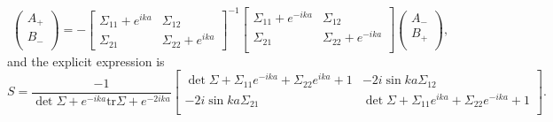 \begin{widetext}
\begin{equation}
\label{eq:discrete_S}
\begin{pmatrix}
A_{+} \\
B_{-}\\
\end{pmatrix}
=-
\begin{bmatrix}
\Sigma_{11} +e^{ika} & \Sigma_{12}\\
\Sigma_{21} & \Sigma_{22} + e^{ika}
\end{bmatrix}^{-1}
\begin{bmatrix}
\Sigma_{11} + e^{-ika} & \Sigma_{12} \\
\Sigma_{21} & \Sigma_{22}  + e^{-ika}  \\
\end{bmatrix}
\begin{pmatrix}
A_{-}\\
B_{+}\\
\end{pmatrix},
\end{equation}
and the explicit expression is
\begin{equation}
  S = \frac{-1}{ \det \Sigma  + e^{-ika} \text{tr} \Sigma   + e^{-2ika}}
\begin{bmatrix}
\det \Sigma+ \Sigma_{11} e^{-ika} + \Sigma_{22} e^{ika}+1  & -2i \sin ka \Sigma_{12}  \\
-2i \sin ka \Sigma_{21} &  \det \Sigma+ \Sigma_{11} e^{ika} + \Sigma_{22} e^{-ika}+1\\
\end{bmatrix}.
\end{equation}
\end{widetext}

